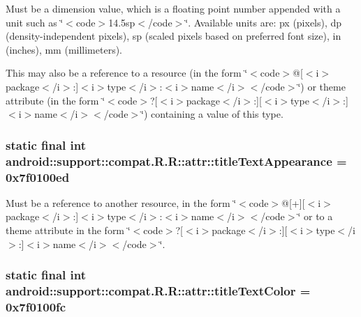 Must be a dimension value, which is a floating point number appended with a unit such as \char`\"{}$<$code$>$14.5sp$<$/code$>$\char`\"{}. Available units are: px (pixels), dp (density-independent pixels), sp (scaled pixels based on preferred font size), in (inches), mm (millimeters). 

This may also be a reference to a resource (in the form \char`\"{}$<$code$>$@\mbox{[}$<$i$>$package$<$/i$>$:\mbox{]}$<$i$>$type$<$/i$>$:$<$i$>$name$<$/i$>$$<$/code$>$\char`\"{}) or theme attribute (in the form \char`\"{}$<$code$>$?\mbox{[}$<$i$>$package$<$/i$>$:\mbox{]}\mbox{[}$<$i$>$type$<$/i$>$:\mbox{]}$<$i$>$name$<$/i$>$$<$/code$>$\char`\"{}) containing a value of this type. \hypertarget{classandroid_1_1support_1_1compat_1_1_r_1_1attr_84556ff4948f803675ccbee6c0d7c2e3}{
\subsubsection[{titleTextAppearance}]{\setlength{\rightskip}{0pt plus 5cm}static final int android::support::compat.R.R::attr::titleTextAppearance = 0x7f0100ed}}
\label{classandroid_1_1support_1_1compat_1_1_r_1_1attr_84556ff4948f803675ccbee6c0d7c2e3}


Must be a reference to another resource, in the form \char`\"{}$<$code$>$@\mbox{[}+\mbox{]}\mbox{[}$<$i$>$package$<$/i$>$:\mbox{]}$<$i$>$type$<$/i$>$:$<$i$>$name$<$/i$>$$<$/code$>$\char`\"{} or to a theme attribute in the form \char`\"{}$<$code$>$?\mbox{[}$<$i$>$package$<$/i$>$:\mbox{]}\mbox{[}$<$i$>$type$<$/i$>$:\mbox{]}$<$i$>$name$<$/i$>$$<$/code$>$\char`\"{}. \hypertarget{classandroid_1_1support_1_1compat_1_1_r_1_1attr_792205c48ea267745ec4d56ca2e64265}{
\subsubsection[{titleTextColor}]{\setlength{\rightskip}{0pt plus 5cm}static final int android::support::compat.R.R::attr::titleTextColor = 0x7f0100fc}}
\label{classandroid_1_1support_1_1compat_1_1_r_1_1attr_792205c48ea267745ec4d56ca2e64265}


